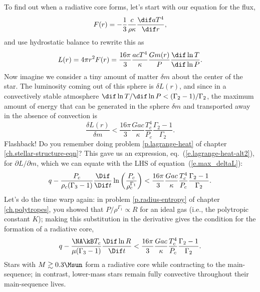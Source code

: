 To find out when a radiative core forms, let's start with our equation for the flux,
\[ F(r) = -\frac{1}{3}\frac{c}{\rho\kappa}\frac{\dif aT^{4}}{\dif r}, \]
and use hydrostatic balance to rewrite this as
\[ L(r) = 4\pi r^{2}F(r) = \frac{16\pi}{3}  \frac{acT^{4}}{\kappa} \frac{Gm(r)}{P} \frac{\dif \ln T}{\dif \ln P}. \]
Now imagine we consider a tiny amount of matter $\delta m$ about the center of the star.  The luminosity coming out of this sphere is $\delta L(r)$,  and since in a convectively stable atmosphere $\dif\ln T/\dif\ln P < (\Gamma_{2}-1)/\Gamma_{2}$, the maximum amount of energy that can be generated in the sphere $\delta m$ and transported away in the absence of convection is
\begin{equation}\label{e.max_deltaL}
  \frac{\delta L(r)}{\delta m} < \frac{16\pi}{3} \frac{Gac}{\kappa} \frac{T_{c}^{4}}{P_{c}}  \frac{\Gamma_{2}-1}{\Gamma_{2}}.
\end{equation}
Flashback! Do you remember doing problem \ref{p.lagrange-heat} of chapter \ref{ch.stellar-structure-eqn}? This gave us an expression, eq.~(\ref{e.lagrange-heat-alt2}), for $\partial L/\partial m$, which we can equate with the LHS of equation~(\ref{e.max_deltaL}):
\[
 q - \frac{P_{c}}{\rho_{c}(\Gamma_{3}-1)}\frac{\Dif }{\Dif t}\ln\left(\frac{P_{c}}{\rho_{c}^{\Gamma_{1}}}\right) <
 	\frac{16\pi}{3} \frac{Gac}{\kappa} \frac{T_{c}^{4}}{P_{c}}  \frac{\Gamma_{2}-1}{\Gamma_{2}}.
\]
Let's do the time warp again: in problem \ref{p.radius-entropy} of chapter \ref{ch.polytropes}, you showed that $P/\rho^{\Gamma_{1}} \propto R$ for an ideal gas (i.e., the polytropic constant $K$); making this substitution in the derivative gives the condition for the formation of a radiative core,
\begin{equation}\label{e.formation-radiative-core}
q - \frac{\NA\kB T_{c}}{\mu(\Gamma_{3}-1)} \frac{\Dif \ln R}{\Dif t} < \frac{16\pi}{3} \frac{Gac}{\kappa} \frac{T_{c}^{4}}{P_{c}}  \frac{\Gamma_{2}-1}{\Gamma_{2}}.
\end{equation}
Stars with $M \gtrsim 0.3 \Msun$ form a radiative core while contracting to the main-sequence; in contrast, lower-mass stars remain fully convective throughout their main-sequence lives.

